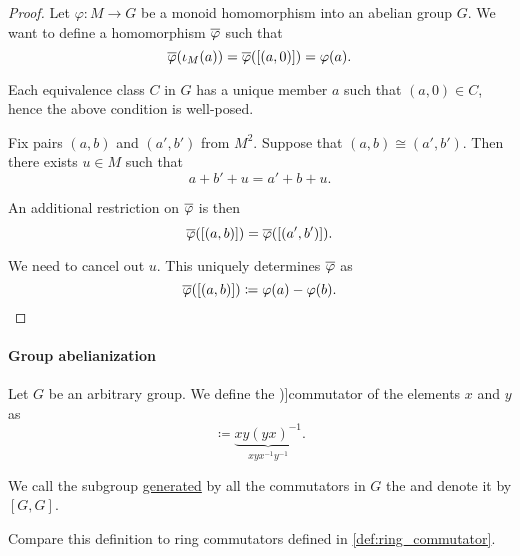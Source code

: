 \begin{proof}
  Let \( \varphi: M \to G \) be a monoid homomorphism into an abelian group \( G \). We want to define a homomorphism \( \oline{\varphi} \) such that
  \begin{equation*}
    \oline{\varphi}(\iota_M(a)) = \oline{\varphi}([(a, 0)]) = \varphi(a).
  \end{equation*}

  Each equivalence class \( C \) in \( G \) has a unique member \( a \) such that \( (a, 0) \in C \), hence the above condition is well-posed.

  Fix pairs \( (a, b) \) and \( (a', b') \) from \( M^2 \). Suppose that \( (a, b) \cong (a', b') \). Then there exists \( u \in M \) such that
  \begin{equation*}
    a + b' + u = a' + b + u.
  \end{equation*}

  An additional restriction on \( \oline{\varphi} \) is then
  \begin{equation*}
    \oline{\varphi}([(a, b)])
    =
    \oline{\varphi}([(a', b')]).
  \end{equation*}

  We need to cancel out \( u \). This uniquely determines \( \oline{\varphi} \) as
  \begin{equation*}
    \oline{\varphi}([(a, b)]) \coloneqq \varphi(a) - \varphi(b).
  \end{equation*}
\end{proof}

\paragraph{Group abelianization}

\begin{definition}\label{def:group_commutator}
  Let \( G \) be an arbitrary group. We define the \term[ru=коммутант (\cite[104]{Мальцев1970АлгебраическиеСистемы})]{commutator} of the elements \( x \) and \( y \) as
  \begin{equation*}
    [x, y] \coloneqq \underbrace{xy(yx)^{-1}}_{xyx^{-1}y^{-1}}.
  \end{equation*}

  We call the subgroup \hyperref[def:group/submodel]{generated} by all the commutators in \( G \) the  and denote it by \( [G, G] \).
\end{definition}
\begin{comments}
  \item Compare this definition to ring commutators defined in \cref{def:ring_commutator}.
\end{comments}

